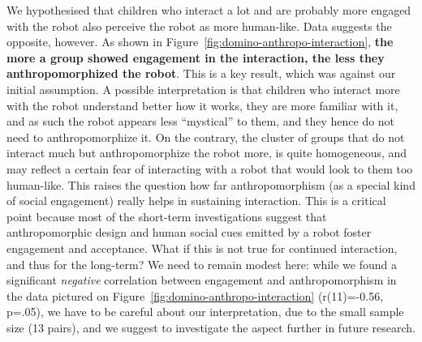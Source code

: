 \documentclass[letterpaper, 10pt, conference]{ieeeconf}
\begin{document}
We hypothesised that children who interact a lot and are probably more engaged
with the robot also perceive the robot as more human-like. Data suggests the
opposite, however. As shown in Figure~\ref{fig:domino-anthropo-interaction}, 
\textbf{the more a group showed engagement in the interaction, the less they
anthropomorphized the robot}. This is a key result, which was against our
initial assumption. A possible interpretation is that children who interact more
with the robot understand better how it works, they are more familiar with it,
and as such the robot appears less ``mystical'' to them, and they hence do not
need to anthropomorphize it. On the contrary, the cluster of groups that do not
interact much but anthropomorphize the robot more, is quite homogeneous, and may
reflect a certain fear of interacting with a robot that would look to them too
human-like.
This raises the question how far anthropomorphism (as a special kind of social
engagement) really helps in sustaining interaction. This is a critical point
because most of the short-term investigations suggest that anthropomorphic
design and human social cues emitted by a robot foster engagement and
acceptance. What if this is not true for continued interaction, and thus for the
long-term? We need to remain modest here: while we found a significant
\emph{negative} correlation between engagement and anthropomorphism in the data
pictured on Figure~\ref{fig:domino-anthropo-interaction} (r(11)=-0.56, p=.05),
we have to be careful about our interpretation, due to the small sample size (13
pairs), and we suggest to investigate the aspect further in future research.
\end{document}
